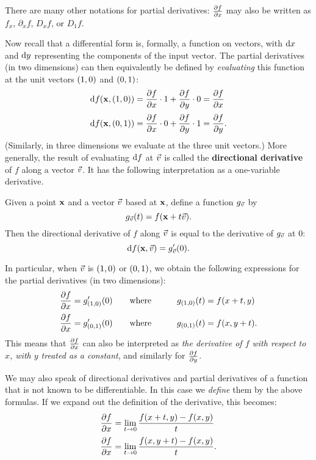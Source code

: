 \documentclass[12pt]{amsart}
\begin{document}
There are many other notations for partial derivatives: $\frac{\partial f}{\partial x}$ may also be written as $f_x$, $\partial_x f$, $D_x f$, or $D_1 f$.

Now recall that a differential form is, formally, a function on vectors, with $\mathrm{d} x$ and $\mathrm{d} y$ representing the components of the input vector.
The partial derivatives (in two dimensions) can then equivalently be defined by \emph{evaluating} this function at the unit vectors $(1,0)$ and $(0,1)$:
\begin{align*}
  \mathrm{d} f(\mathbf{x},(1,0)) &= \frac{\partial f}{\partial x}\cdot 1 + \frac{\partial f}{\partial y}\cdot 0 = \frac{\partial f}{\partial x}\\[2pt]
  \mathrm{d} f(\mathbf{x},(0,1)) &= \frac{\partial f}{\partial x}\cdot 0 + \frac{\partial f}{\partial y}\cdot 1 = \frac{\partial f}{\partial y}.
\end{align*}
(Similarly, in three dimensions we evaluate at the three unit vectors.)
More generally, the result of evaluating $\mathrm{d} f$ at $\vec{v}$ is called the \textbf{directional derivative} of $f$ along a vector $\vec{v}$.
It has the following interpretation as a one-variable derivative.

\begin{thm}
  Given a point $\mathbf{x}$ and a vector $\vec{v}$ based at $\mathbf{x}$, define a function $g_{\vec{v}}$ by
  \[ g_{\vec{v}}(t) = f(\mathbf{x} + t \vec{v}). \]
  Then the directional derivative of $f$ along $\vec{v}$ is equal to the derivative of $g_{\vec{v}}$ at $0$:
  \[ \mathrm{d} f(\mathbf{x},\vec{v}) = g_{\vec{v}}'(0). \]
\end{thm}

In particular, when $\vec{v}$ is $(1,0)$ or $(0,1)$, we obtain the following expressions for the partial derivatives (in two dimensions):
\begin{alignat*}{2}
  \frac{\partial f}{\partial x} &= g_{(1,0)}'(0) \qquad\text{where}\qquad & g_{(1,0)}(t) &= f(x+t,y)\\[2pt]
  \frac{\partial f}{\partial x} &= g_{(0,1)}'(0) \qquad\text{where}\qquad & g_{(0,1)}(t) &= f(x,y+t).
\end{alignat*}
This means that $\frac{\partial f}{\partial x}$ can also be interpreted as \emph{the derivative of $f$ with respect to $x$, with $y$ treated as a constant}, and similarly for $\frac{\partial f}{\partial y}$.

We may also speak of directional derivatives and partial derivatives of a function that is not known to be differentiable.
In this case we \emph{define} them by the above formulas.
If we expand out the definition of the derivative, this becomes:
\begin{align}
  \frac{\partial f}{\partial x} &= \lim_{t\to 0} \frac{f(x+t,y) - f(x,y)}{t}\\[2pt]
  \frac{\partial f}{\partial x} &= \lim_{t\to 0} \frac{f(x,y+t) - f(x,y)}{t}.
\end{align}
\end{document}
